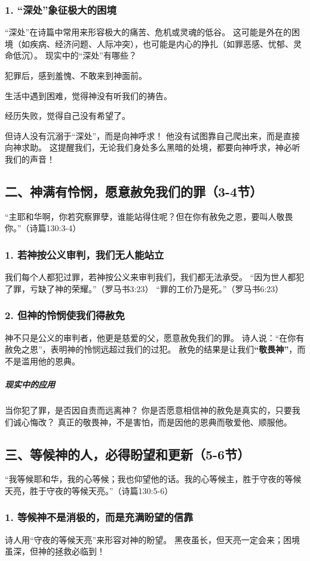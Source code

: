 \documentclass[a4paper, 12pt]{article}
\begin{document}
\subsubsection*{1. “深处”象征极大的困境}
“深处”在诗篇中常用来形容极大的痛苦、危机或灵魂的低谷。
这可能是外在的困境（如疾病、经济问题、人际冲突），也可能是内心的挣扎（如罪恶感、忧郁、灵命低沉）。
现实中的“深处”有哪些？

犯罪后，感到羞愧、不敢来到神面前。

生活中遇到困难，觉得神没有听我们的祷告。

经历失败，觉得自己没有希望了。

但诗人没有沉溺于“深处”，而是向神呼求！
他没有试图靠自己爬出来，而是直接向神求助。
这提醒我们，无论我们身处多么黑暗的处境，都要向神呼求，神必听我们的声音！
\subsection*{二、神满有怜悯，愿意赦免我们的罪（3-4节）}
“主耶和华啊，你若究察罪孽，谁能站得住呢？但在你有赦免之恩，要叫人敬畏你。”（诗篇130:3-4）

\subsubsection*{1. 若神按公义审判，我们无人能站立}
我们每个人都犯过罪，若神按公义来审判我们，我们都无法承受。
“因为世人都犯了罪，亏缺了神的荣耀。”（罗马书3:23）
“罪的工价乃是死。”（罗马书6:23）
\subsubsection*{2. 但神的怜悯使我们得赦免}
神不只是公义的审判者，他更是慈爱的父，愿意赦免我们的罪。
诗人说：“在你有赦免之恩”，表明神的怜悯远超过我们的过犯。
赦免的结果是让我们\textbf{“敬畏神”}，而不是滥用他的恩典。
\subparagraph*{现实中的应用}

当你犯了罪，是否因自责而远离神？
你是否愿意相信神的赦免是真实的，只要我们诚心悔改？
真正的敬畏神，不是害怕，而是因他的恩典而敬爱他、顺服他。
\subsection*{三、等候神的人，必得盼望和更新（5-6节）}
“我等候耶和华，我的心等候；我也仰望他的话。我的心等候主，胜于守夜的等候天亮，胜于守夜的等候天亮。”（诗篇130:5-6）

\subsubsection*{1. 等候神不是消极的，而是充满盼望的信靠}
诗人用“守夜的等候天亮”来形容对神的盼望。
黑夜虽长，但天亮一定会来；困境虽深，但神的拯救必临到！
\end{document}
